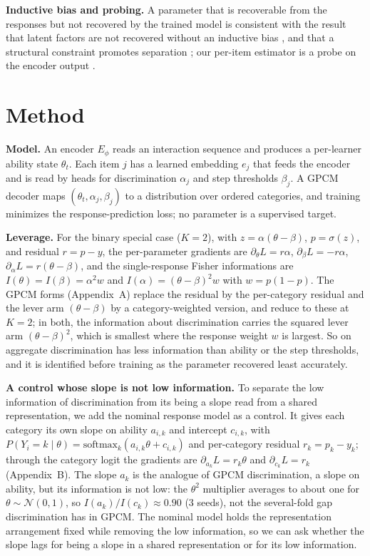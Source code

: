 \documentclass[twocolumn,10pt]{article}
\begin{document}
\textbf{Inductive bias and probing.} A parameter that is recoverable from the responses but
not recovered by the trained model is consistent with the result that latent factors are
not recovered without an inductive bias \citep{locatello2019}, and that a structural
constraint promotes separation \citep{higgins2017}; our per-item estimator is a probe on
the encoder output \citep{alain2017}.

\section{Method}
\textbf{Model.} An encoder $E_\phi$ reads an interaction sequence and produces a per-learner
ability state $\theta_t$. Each item $j$ has a learned embedding $e_j$ that feeds the encoder and
is read by heads for discrimination $\alpha_j$ and step thresholds $\beta_j$. A GPCM decoder
maps $(\theta_t,\alpha_j,\beta_j)$ to a distribution over ordered categories, and training
minimizes the response-prediction loss; no parameter is a supervised target.

\textbf{Leverage.} For the binary special case ($K=2$), with $z=\alpha(\theta-\beta)$,
$p=\sigma(z)$, and residual $r=p-y$, the per-parameter gradients are $\partial_\theta
L=r\alpha$, $\partial_\beta L=-r\alpha$, $\partial_\alpha L=r(\theta-\beta)$, and the
single-response Fisher informations are $I(\theta)=I(\beta)=\alpha^2 w$ and
$I(\alpha)=(\theta-\beta)^2 w$ with $w=p(1-p)$. The GPCM forms (Appendix~A) replace the
residual by the per-category residual and the lever arm $(\theta-\beta)$ by a
category-weighted version, and reduce to these at $K=2$; in both, the information about
discrimination carries the squared lever arm $(\theta-\beta)^2$, which is smallest where
the response weight $w$ is largest. So on aggregate discrimination has less information than
ability or the step thresholds, and it is identified before training as the parameter
recovered least accurately.

\textbf{A control whose slope is not low information.} To separate the low information of
discrimination from its being a slope read from a shared representation, we add the nominal
response model \citep{bock1972} as a control. It gives each category its own slope on
ability $a_{i,k}$ and intercept $c_{i,k}$, with
$P(Y_i=k\mid\theta)=\mathrm{softmax}_k(a_{i,k}\theta+c_{i,k})$ and per-category residual
$r_k=p_k-y_k$; through the category logit the gradients are $\partial_{a_k}L=r_k\theta$ and
$\partial_{c_k}L=r_k$ (Appendix~B). The slope $a_k$ is the analogue of GPCM discrimination,
a slope on ability, but its information is not low: the $\theta^2$ multiplier averages to
about one for $\theta\sim\mathcal{N}(0,1)$, so $I(a_k)/I(c_k)\approx0.90$ (3 seeds), not the
several-fold gap discrimination has in GPCM. The nominal model holds the representation
arrangement fixed while removing the low information, so we can ask whether the slope lags
for being a slope in a shared representation or for its low information.
\end{document}
